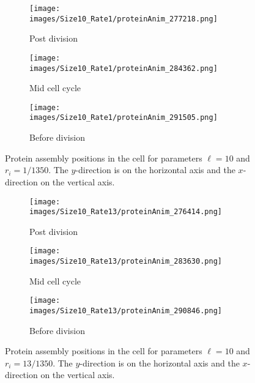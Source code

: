 \begin{figure}[htbp]
    \centering
    \begin{subfigure}[b]{\textwidth}
        \centering
        \texttt{[image: images/Size10\_Rate1/proteinAnim\_277218.png]}
        \caption{Post division}
        \label{subfig:10_1_post}
    \end{subfigure}
    \vfill
    \begin{subfigure}[b]{\textwidth}
        \centering
        \texttt{[image: images/Size10\_Rate1/proteinAnim\_284362.png]}
        \caption{Mid cell cycle}
        \label{subfig:10_1_mid}
    \end{subfigure}
    \vfill
    \begin{subfigure}[b]{\textwidth}
        \centering
        \texttt{[image: images/Size10\_Rate1/proteinAnim\_291505.png]}
        \caption{Before division}
        \label{subfig:10_1_pre}
    \end{subfigure}
    \caption{
    Protein assembly positions in the cell for parameters $\ell=10$ and $r_i=1/1350$. The $y$-direction is on the horizontal axis and the $x$-direction on the vertical axis.
    }
    \label{fig:10_1_cellcycle}
\end{figure}

\begin{figure}[htbp]
    \centering
    \begin{subfigure}[b]{\textwidth}
        \centering
        \texttt{[image: images/Size10\_Rate13/proteinAnim\_276414.png]}
        \caption{Post division}
        \label{subfig:10_13_post}
    \end{subfigure}
    \vfill
    \begin{subfigure}[b]{\textwidth}
        \centering
        \texttt{[image: images/Size10\_Rate13/proteinAnim\_283630.png]}
        \caption{Mid cell cycle}
        \label{subfig:10_13_mid}
    \end{subfigure}
    \vfill
    \begin{subfigure}[b]{\textwidth}
        \centering
        \texttt{[image: images/Size10\_Rate13/proteinAnim\_290846.png]}
        \caption{Before division}
        \label{subfig:10_13_pre}
    \end{subfigure}
    \caption{
    Protein assembly positions in the cell for parameters $\ell=10$ and $r_i=13/1350$. The $y$-direction is on the horizontal axis and the $x$-direction on the vertical axis.
    }
    \label{fig:10_13_cellcycle}
\end{figure}

